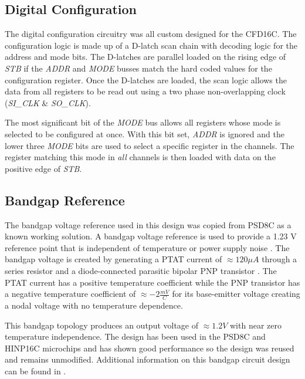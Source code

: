 \documentclass[12pt,oneside,final]{siuethesis}
\theoremstyle{definition}
\begin{document}
\subsection{Digital Configuration}
\par The digital configuration circuitry was all custom designed for the CFD16C. The configuration logic is made up of a D-latch scan chain with decoding logic for the address and mode bits. The D-latches are parallel loaded on the rising edge of \emph{STB} if the \emph{ADDR} and \emph{MODE} busses match the hard coded values for the configuration register. Once the D-latches are loaded, the scan logic allows the data from all registers to be read out using a two phase non-overlapping clock (\emph{SI\_CLK} \& \emph{SO\_CLK}). 
\par The most significant bit of the \emph{MODE} bus allows all registers whose mode is selected to be configured at once. With this bit set, \emph{ADDR} is ignored and the lower three \emph{MODE} bits are used to select a specific register in the channels. The register matching this mode in \emph{all} channels is then loaded with data on the positive edge of \emph{STB}.
\subsection{Bandgap Reference}
\par The bandgap voltage reference used in this design was copied from PSD8C as a known working solution. A bandgap voltage reference is used to provide a 1.23 V reference point that is independent of temperature or power supply noise \cite{BANDGAP}. The bandgap voltage is created by generating a PTAT current of $\approx 120 \mu A$ through a series resistor and a diode-connected parasitic bipolar PNP transistor \cite{ALLEN-HOLBERG}. The PTAT current has a positive temperature coefficient while the PNP transistor has a negative temperature coefficient of $\approx -2 \frac{mV}{C}$ for its base-emitter voltage creating a nodal voltage with no temperature dependence.
\par This bandgap topology produces an output voltage of $\approx 1.2 V$ with near zero temperature independence. The design has been used in the PSD8C and HINP16C microchips and has shown good performance so the design was reused and remains unmodified. Additional information on this bandgap circuit design can be found in \cite{HINP-THESIS}.
\end{document}
